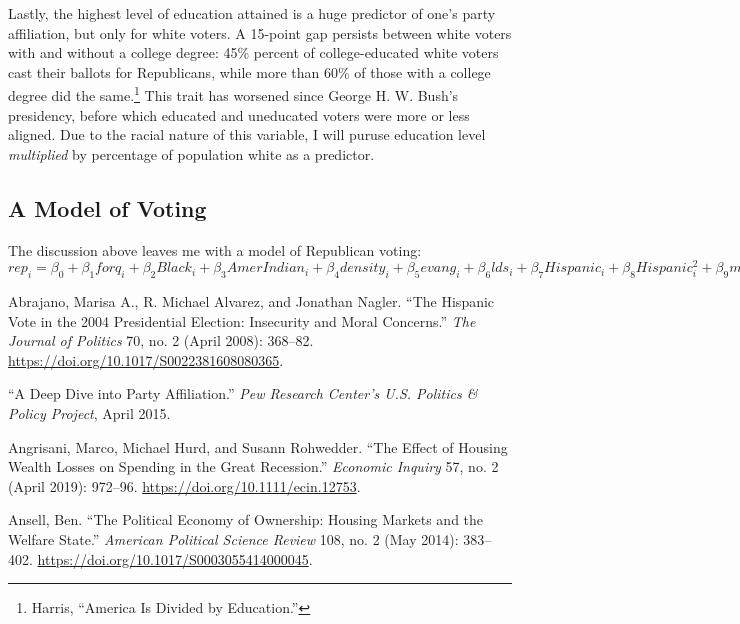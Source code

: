\documentclass[
]{article}
\begin{document}
Lastly, the highest level of education attained is a huge predictor of one's party affiliation, but only for white voters.
A 15-point gap persists between white voters with and without a college degree: 45\% percent of college-educated white voters cast their ballots for Republicans, while more than 60\% of those with a college degree did the same.\footnote{Harris, ``America Is Divided by Education.''}
This trait has worsened since George H. W. Bush's presidency, before which educated and uneducated voters were more or less aligned.
Due to the racial nature of this variable, I will puruse education level \emph{multiplied} by percentage of population white as a predictor.

\hypertarget{model}{%
\subsection{A Model of Voting}\label{model}}

The discussion above leaves me with a model of Republican voting:
\(rep_i = \beta_0 + \beta_1forq_i + \beta_2Black_i + \beta_3AmerIndian_i + \beta_4density_i + \beta_5evang_i + \beta_6lds_i + \beta_7Hispanic_i + \beta_8Hispanic^2_i + \beta_9medHHI_i + \beta_{10}ownhome_i + \beta_{11}unemchange_i + \beta_{12}old_i + \beta_{13}(somecol_i \times white_i) + \epsilon_i\)

\hypertarget{refs}{}
\leavevmode\hypertarget{ref-abrajano2008hispanic}{}%
Abrajano, Marisa A., R. Michael Alvarez, and Jonathan Nagler. ``The Hispanic Vote in the 2004 Presidential Election: Insecurity and Moral Concerns.'' \emph{The Journal of Politics} 70, no. 2 (April 2008): 368--82. \url{https://doi.org/10.1017/S0022381608080365}.

\leavevmode\hypertarget{ref-2015deep}{}%
``A Deep Dive into Party Affiliation.'' \emph{Pew Research Center's U.S. Politics \& Policy Project}, April 2015.

\leavevmode\hypertarget{ref-angrisani2019effect}{}%
Angrisani, Marco, Michael Hurd, and Susann Rohwedder. ``The Effect of Housing Wealth Losses on Spending in the Great Recession.'' \emph{Economic Inquiry} 57, no. 2 (April 2019): 972--96. \url{https://doi.org/10.1111/ecin.12753}.

\leavevmode\hypertarget{ref-ansellPoliticalEconomyOwnership2014}{}%
Ansell, Ben. ``The Political Economy of Ownership: Housing Markets and the Welfare State.'' \emph{American Political Science Review} 108, no. 2 (May 2014): 383--402. \url{https://doi.org/10.1017/S0003055414000045}.
\end{document}
